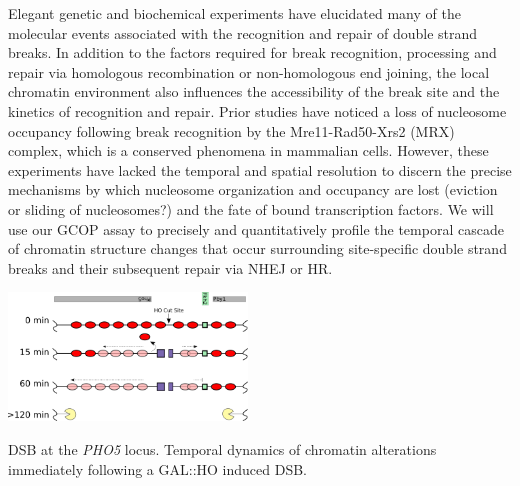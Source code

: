 {}
Elegant genetic and biochemical experiments have elucidated many of the molecular events associated with the recognition and repair of  double strand breaks\citep{Haber2016-ca,Lieber2010-cl,Renkawitz2014-jz,Jasin2013-fv}.  In addition to the factors required for break recognition, processing and repair via homologous recombination or non-homologous end joining, the local chromatin environment also influences the accessibility of the break site
and the kinetics of recognition and repair\citep{Price2013-lp,Smerdon1991-sv}. Prior studies have noticed a loss of nucleosome occupancy following break recognition by the Mre11-Rad50-Xrs2 (MRX) complex\citep{Tsukuda2005}, which is a conserved phenomena in mammalian cells\citep{Goldstein2013}. However, these experiments have lacked the temporal and spatial resolution to discern the precise mechanisms by which nucleosome organization and occupancy are lost (\eg eviction or sliding of nucleosomes?) and the fate of bound transcription factors.  We will use our GCOP assay to precisely and quantitatively profile the temporal cascade of chromatin structure changes that occur surrounding site-specific double strand breaks and their subsequent repair via NHEJ or HR.
\begin{floatingfigure}[r]{2.5in}
\vspace{-8mm}
\begin{center}
\includegraphics[width=2.5in]{r35_figures/cut_process.png}
\end{center}
\vspace{4mm}
\caption{DSB at the \textit{PHO5} locus. Temporal dynamics of chromatin alterations immediately following a GAL::HO induced DSB. }%
\end{floatingfigure}


